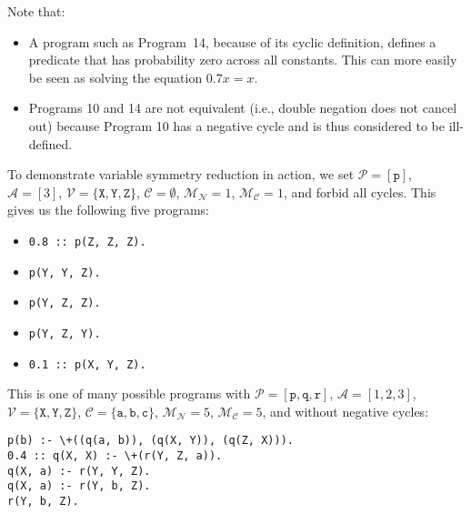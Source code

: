 \documentclass[runningheads]{llncs}
\newcommand{\predicates}{\mathcal{P}}
\newcommand{\variables}{\mathcal{V}}
\newcommand{\constants}{\mathcal{C}}
\newcommand{\arities}{\mathcal{A}}
\newcommand{\maxNumNodes}{\mathcal{M}_{\mathcal{N}}}
\newcommand{\maxNumClauses}{\mathcal{M}_{\mathcal{C}}}
\begin{document}
Note that:
\begin{itemize}
\item A program such as Program~14, because of its cyclic definition, defines a
  predicate that has probability zero across all constants. This can more easily
  be seen as solving the equation $0.7x = x$.
\item Programs 10 and 14 are not equivalent (i.e., double negation does not
  cancel out) because Program 10 has a negative cycle and is thus considered to
  be ill-defined.
\end{itemize}

To demonstrate variable symmetry reduction in action, we set $\predicates{} =
[\texttt{p}]$, $\arities{} = [3]$, $\variables{} = \{\texttt{X}, \texttt{Y},
\texttt{Z} \}$, $\constants{} = \emptyset$, $\maxNumNodes{} = 1$,
$\maxNumClauses{} = 1$, and forbid all cycles. This gives us the following five
programs:

\begin{itemize}
\item
\begin{verbatim}
0.8 :: p(Z, Z, Z).
\end{verbatim}
\item
\begin{verbatim}
p(Y, Y, Z).
\end{verbatim}
\item
\begin{verbatim}
p(Y, Z, Z).
\end{verbatim}
\item
\begin{verbatim}
p(Y, Z, Y).
\end{verbatim}
\item
\begin{verbatim}
0.1 :: p(X, Y, Z).
\end{verbatim}
\end{itemize}

This is one of many possible programs with $\predicates{} = [\texttt{p},
\texttt{q}, \texttt{r}]$, $\arities{} = [1, 2, 3]$, $\variables{} =
\{\texttt{X}, \texttt{Y}, \texttt{Z} \}$, $\constants{} = \{ \texttt{a},
\texttt{b}, \texttt{c} \}$, $\maxNumNodes{} = 5$, $\maxNumClauses{} = 5$, and
without negative cycles:

\begin{verbatim}
p(b) :- \+((q(a, b)), (q(X, Y)), (q(Z, X))).
0.4 :: q(X, X) :- \+(r(Y, Z, a)).
q(X, a) :- r(Y, Y, Z).
q(X, a) :- r(Y, b, Z).
r(Y, b, Z).
\end{verbatim}
\end{document}
